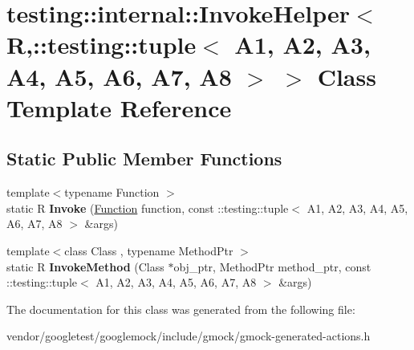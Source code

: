 \hypertarget{classtesting_1_1internal_1_1InvokeHelper_3_01R_00_1_1testing_1_1tuple_3_01A1_00_01A2_00_01A3_00_c3256b948e767f440ca72203dbf5e97c}{}\section{testing\+:\+:internal\+:\+:Invoke\+Helper$<$ R,\+:\+:testing\+:\+:tuple$<$ A1, A2, A3, A4, A5, A6, A7, A8 $>$ $>$ Class Template Reference}
\label{classtesting_1_1internal_1_1InvokeHelper_3_01R_00_1_1testing_1_1tuple_3_01A1_00_01A2_00_01A3_00_c3256b948e767f440ca72203dbf5e97c}
\subsection*{Static Public Member Functions}
\begin{DoxyCompactItemize}
\item 
{\footnotesize template$<$typename Function $>$ }\\static R {\bfseries Invoke} (\hyperlink{structtesting_1_1internal_1_1Function}{Function} function, const \+::testing\+::tuple$<$ A1, A2, A3, A4, A5, A6, A7, A8 $>$ \&args)\hypertarget{classtesting_1_1internal_1_1InvokeHelper_3_01R_00_1_1testing_1_1tuple_3_01A1_00_01A2_00_01A3_00_c3256b948e767f440ca72203dbf5e97c_ab3e6e35a1321c77445f7b8a7ffc2296d}{}\label{classtesting_1_1internal_1_1InvokeHelper_3_01R_00_1_1testing_1_1tuple_3_01A1_00_01A2_00_01A3_00_c3256b948e767f440ca72203dbf5e97c_ab3e6e35a1321c77445f7b8a7ffc2296d}

\item 
{\footnotesize template$<$class Class , typename Method\+Ptr $>$ }\\static R {\bfseries Invoke\+Method} (Class $\ast$obj\+\_\+ptr, Method\+Ptr method\+\_\+ptr, const \+::testing\+::tuple$<$ A1, A2, A3, A4, A5, A6, A7, A8 $>$ \&args)\hypertarget{classtesting_1_1internal_1_1InvokeHelper_3_01R_00_1_1testing_1_1tuple_3_01A1_00_01A2_00_01A3_00_c3256b948e767f440ca72203dbf5e97c_ac7b11abc03a2df1b3572a8852efc0fb9}{}\label{classtesting_1_1internal_1_1InvokeHelper_3_01R_00_1_1testing_1_1tuple_3_01A1_00_01A2_00_01A3_00_c3256b948e767f440ca72203dbf5e97c_ac7b11abc03a2df1b3572a8852efc0fb9}

\end{DoxyCompactItemize}


The documentation for this class was generated from the following file\+:\begin{DoxyCompactItemize}
\item 
vendor/googletest/googlemock/include/gmock/gmock-\/generated-\/actions.\+h\end{DoxyCompactItemize}
